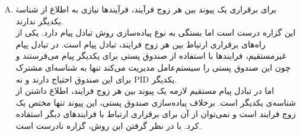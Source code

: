 \documentclass[]{article}
\begin{document}
\begin{enumerate}[(A)]
    \item ﺑﺮﺍﯼ ﺑﺮﻗﺮﺍﺭﯼ ﯾﮏ ﭘﯿﻮﻧﺪ ﺑﯿﻦ ﻫﺮ ﺯﻭﺝ ﻓﺮﺁﯾﻨﺪ، ﻓﺮﺁﯾﻨﺪﻫﺎ ﻧﯿﺎﺯﯼ ﺑﻪ ﺍﻃﻼﻉ ﺍﺯ ﺷﻨﺎﺳﮥ ﯾﮑﺪﯾﮕﺮ ﻧﺪﺍﺭﻧﺪ.
          \\
          این گزاره درست است اما بستگی به نوع پیاده‌سازی روش تبادل پیام دارد. یکی از راه‌های
          برقراری ارتباط بین هر زوج فرایند، تبادل پیام است. در تبادل پیام غیرمستقیم،
          فرایندها با استفاده از صندوق پستی برای یکدیگر پیام می‌فرستند
          و چون این صندوق پستی را سیستم‌عامل مدیریت می‌کند تنها به شناسه‌ای مشترک برای این صندوق احتیاج دارند
          و نه PID یکدیگر.
          \\
          اما در تبادل پیام مستقیم لازمه یک پیوند بین هر زوج فرایند، اطلاع داشتن از شناسه‌ی یکدیگر است. برخلاف پیاده‌سازی صندوق پستی،
          این پیوند تنها مختص یک زوج فرایند است و نمی‌توان از آن برای برقراری ارتباط با فرایندهای دیگر استفاده کرد. با در نظر گرفتن این روش، گزاره نادرست است.


\end{enumerate}
\end{document}
